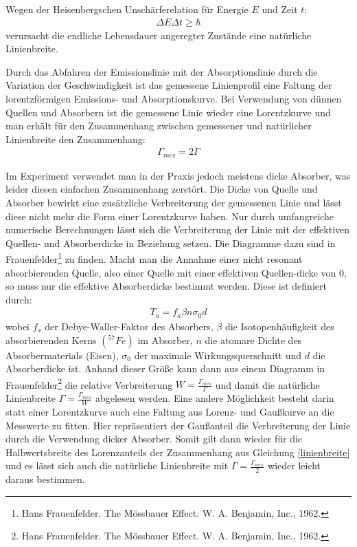\documentclass[12pt]{article}
\begin{document}
Wegen der Heisenbergschen Unschärferelation für Energie $E$ und Zeit $t$:
\begin{align}
 \Delta E \Delta t \geq \hbar
\end{align}
verursacht die endliche Lebensdauer angeregter Zustände eine natürliche Linienbreite.

Durch das Abfahren der Emissionslinie mit der Absorptionslinie durch die Variation der Geschwindigkeit ist das gemessene Linienprofil eine Faltung der lorentzförmigen
Emissions- und Absorptionskurve. Bei Verwendung von dünnen Quellen und Absorbern ist die gemessene Linie wieder eine Lorentzkurve und man erhält für den Zusammenhang
zwischen gemessener und natürlicher Linienbreite den Zusammenhang:
\begin{align}
 \label{linienbreite}
 \Gamma_{mes} = 2\Gamma
\end{align}

Im Experiment verwendet man in der Praxis jedoch meistens dicke Absorber, was leider diesen einfachen Zusammenhang zerstört. Die Dicke von Quelle und Absorber bewirkt
eine zusätzliche Verbreiterung der gemessenen Linie und lässt diese nicht mehr die Form einer Lorentzkurve haben. Nur durch umfangreiche numerische Berechnungen
lässt sich die Verbreiterung der Linie mit der effektiven Quellen- und Absorberdicke in Beziehung setzen. Die Diagramme dazu sind in Frauenfelder\footnote{Hans Frauenfelder. The Mössbauer Effect. W. A. Benjamin, Inc., 1962.} zu finden.
Macht man die Annahme einer nicht resonant absorbierenden Quelle, also einer Quelle mit einer effektiven Quellen-dicke von 0, so muss nur die effektive Absorberdicke bestimmt
werden. Diese ist definiert durch:
\begin{align}
 T_a = f_a \beta n \sigma_0 d
\end{align}
wobei $f_a$ der Debye-Waller-Faktor des Absorbers, $\beta$ die Isotopenhäufigkeit des absorbierenden Kerns $(^{57}Fe)$ im Absorber, $n$ die atomare Dichte
des Absorbermaterials (Eisen), $\sigma_0$ der maximale Wirkungsquerschnitt und $d$ die Absorberdicke ist. Anhand dieser Größe kann dann aus einem Diagramm in Frauenfelder\footnote{Hans Frauenfelder. The Mössbauer Effect. W. A. Benjamin, Inc., 1962.}
die relative Verbreiterung $W = \frac{\Gamma_{mes}}{\Gamma}$ und damit die natürliche Linienbreite $\Gamma = \frac{\Gamma_{mes}}{W}$ abgelesen werden.
Eine andere Möglichkeit besteht darin statt einer Lorentzkurve auch eine Faltung aus Lorenz- und Gaußkurve an die Messwerte zu fitten. Hier repräsentiert der Gaußanteil
die Verbreiterung der Linie durch die Verwendung dicker Absorber. Somit gilt dann wieder für die Halbwertsbreite des Lorenzanteils der Zusammenhang aus Gleichung \ref{linienbreite} 
und es lässt sich auch die natürliche Linienbreite mit $\Gamma = \frac{\Gamma_{mes}}{2}$ wieder leicht daraus bestimmen.
\end{document}
